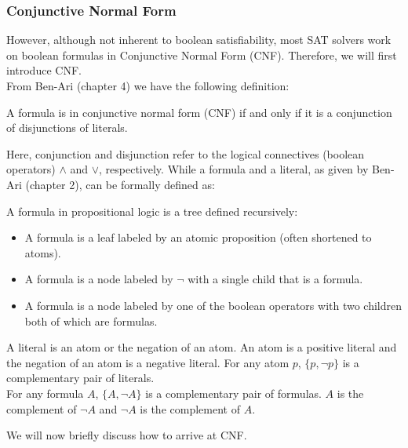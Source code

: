\subsubsection{Conjunctive Normal Form}\label{sec:CNF}
However, although not inherent to boolean satisfiability, most SAT solvers work on boolean formulas in Conjunctive Normal Form (CNF). Therefore, we will first introduce CNF.
\\
From Ben-Ari (chapter 4)\cite{Math-Logic-for-CompSci} we have the following definition:
\begin{definition}\label{def:CNF}
    A formula is in conjunctive normal form (CNF) if and only if it is a conjunction of disjunctions of literals.
\end{definition}
Here, conjunction and disjunction refer to the logical connectives (boolean operators) $\wedge$ and $\vee$, respectively. While a formula and a literal, as given by Ben-Ari (chapter 2)\cite{Math-Logic-for-CompSci}, can be formally defined as:
\begin{definition}\label{def:propositional_formulas}
    A formula in propositional logic is a tree defined recursively:
    \begin{itemize}
        \item A formula is a leaf labeled by an atomic proposition (often shortened
        to atoms).
        \item A formula is a node labeled by $\neg$ with a single child that is a formula.
        \item A formula is a node labeled by one of the boolean operators with two children both of which are formulas.
    \end{itemize}
\end{definition}
\begin{definition}\label{def:propositional_atoms}
    A literal is an atom or the negation of an atom. An atom is a positive
    literal and the negation of an atom is a negative literal. For any atom $p$, $\{p,\neg p\}$ is a complementary pair of literals.
    \\
    For any formula $A$, $\{A,\neg A\}$ is a complementary pair of formulas. $A$ is the complement of $\neg A$ and $\neg A$ is the complement of $A$.
\end{definition}
We will now briefly discuss how to arrive at CNF.

